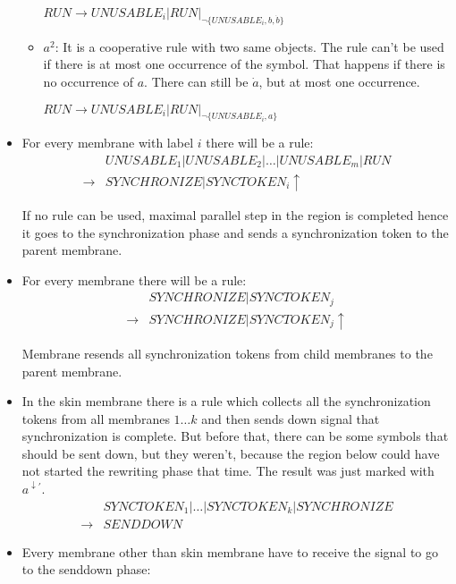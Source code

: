 \begin{dokaz}
\begin{itemize}
\begin{itemize}
      $RUN \rightarrow UNUSABLE_i|RUN|_{\neg\{UNUSABLE_i, b, \dot{b}\}}$

      \item $a^2$: It is a cooperative rule with two same objects. The rule can't be used if there is at most one occurrence of the symbol. That happens if there is no occurrence of $a$. There can still be $\dot{a}$, but at most one occurrence.

      $RUN \rightarrow UNUSABLE_i|RUN|_{\neg\{UNUSABLE_i, a\}}$
    \end{itemize}

    \item For every membrane with label $i$ there will be a rule:
    \begin{align*}
      &UNUSABLE_1|UNUSABLE_2|\dots|UNUSABLE_m|RUN \\
      \rightarrow &SYNCHRONIZE|SYNCTOKEN_i\uparrow
    \end{align*}

    If no rule can be used, maximal parallel step in the region is completed hence it goes to the synchronization phase and sends a synchronization token to the parent membrane.

    \item For every membrane there will be a rule:
    \begin{align*}
      &SYNCHRONIZE|SYNCTOKEN_j \\
      \rightarrow &SYNCHRONIZE|SYNCTOKEN_j\uparrow
    \end{align*}

    Membrane resends all synchronization tokens from child membranes to the parent membrane.

    \item In the skin membrane there is a rule which collects all the synchronization tokens from all membranes $1\dots k$ and then sends down signal that synchronization is complete. But before that, there can be some symbols that should be sent down, but they weren't, because the region below could have not started the rewriting phase that time. The result was just marked with $a^{\downarrow\prime}$.
    \begin{align*}
      &SYNCTOKEN_1|\dots|SYNCTOKEN_k|SYNCHRONIZE \\
      \rightarrow &SENDDOWN
    \end{align*}

    \item Every membrane other than skin membrane have to receive the signal to go to the senddown phase:


\end{itemize}
\end{dokaz}

